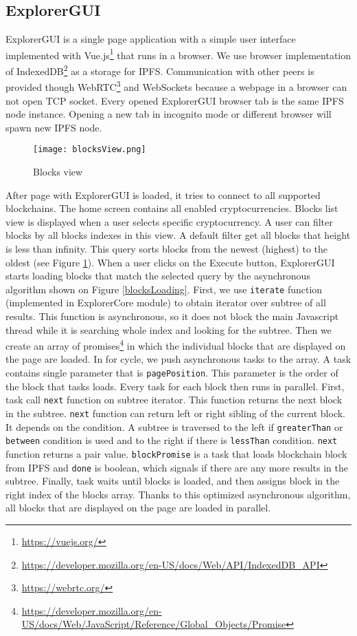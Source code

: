 \subsection{ExplorerGUI}
ExplorerGUI is a single page application with a simple user interface implemented with Vue.js\footnote{\url{https://vuejs.org/}} that runs in a browser. We use browser implementation of IndexedDB\footnote{\url{https://developer.mozilla.org/en-US/docs/Web/API/IndexedDB_API}} as a storage for IPFS. Communication with other peers is provided though WebRTC\footnote{\url{https://webrtc.org/}} and WebSockets because a webpage in a browser can not open TCP socket. Every opened ExplorerGUI browser tab is the same IPFS node instance. Opening a new tab in incognito mode or different browser will spawn new IPFS node.

\begin{figure}[h]
    \centering
    \texttt{[image: blocksView.png]}
    \caption{Blocks view}
    \label{blocksView}
\end{figure}

After page with ExplorerGUI is loaded, it tries to connect to all supported blockchains. The home screen contains all enabled cryptocurrencies. Blocks list view is displayed when a user selects specific cryptocurrency. A user can filter blocks by all blocks indexes in this view. A default filter get all blocks that height is less than infinity. This query sorts blocks from the newest (highest) to the oldest (see Figure \ref{blocksView}). When a user clicks on the Execute button, ExplorerGUI starts loading blocks that match the selected query by the asynchronous algorithm shown on Figure \ref{blocksLoading}. First, we use \texttt{iterate} function (implemented in ExplorerCore module) to obtain iterator over subtree of all results. This function is asynchronous, so it does not block the main Javascript thread while it is searching whole index and looking for the subtree. Then we create an array of promises\footnote{\url{https://developer.mozilla.org/en-US/docs/Web/JavaScript/Reference/Global_Objects/Promise}} in which the individual blocks that are displayed on the page are loaded. In for cycle, we push asynchronous tasks to the array. A task contains single parameter that is \texttt{pagePosition}. This parameter is the order of the block that tasks loads. Every task for each block then runs in parallel. First, task call \texttt{next} function on subtree iterator. This function returns the next block in the subtree. \texttt{next} function can return left or right sibling of the current block. It depends on the condition. A subtree is traversed to the left if \texttt{greaterThan} or \texttt{between} condition is used and to the right if there is \texttt{lessThan} condition. \texttt{next} function returns a pair value. \texttt{blockPromise} is a task that loads blockchain block from IPFS and \texttt{done} is boolean, which signals if there are any more results in the subtree. Finally, task waits until blocks is loaded, and then assigns block in the right index of the blocks array. Thanks to this optimized asynchronous algorithm, all blocks that are displayed on the page are loaded in parallel.

